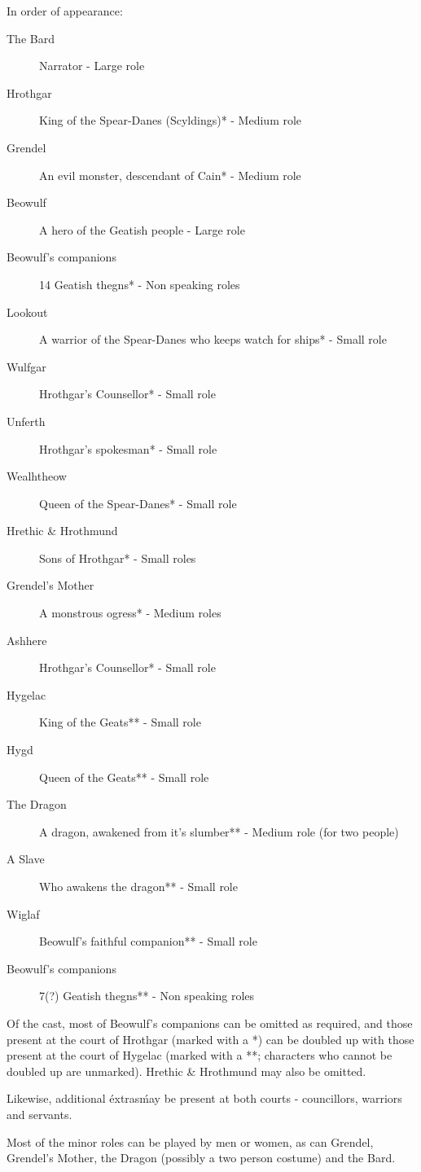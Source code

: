 \documentclass[a4paper]{article}
\begin{document}
In order of appearance:
\begin{description}
    \item[The Bard] Narrator - Large role
    \item[Hrothgar] King of the Spear-Danes (Scyldings)* - Medium role
    \item[Grendel] An evil monster, descendant of Cain* - Medium role
    \item[Beowulf] A hero of the Geatish people - Large role
    \item[Beowulf's companions] 14 Geatish thegns* - Non speaking roles
    \item[Lookout] A warrior of the Spear-Danes who keeps watch for ships* - Small role
    \item[Wulfgar] Hrothgar's Counsellor* - Small role
    \item[Unferth] Hrothgar's spokesman* - Small role
    \item[Wealhtheow] Queen of the Spear-Danes* - Small role
    \item[Hrethic \& Hrothmund] Sons of Hrothgar* - Small roles
    \item[Grendel's Mother] A monstrous ogress* - Medium roles
    \item[Ashhere] Hrothgar's Counsellor* - Small role
    \item[Hygelac] King of the Geats** - Small role
    \item[Hygd] Queen of the Geats** - Small role
    \item[The Dragon] A dragon, awakened from it's slumber** - Medium role (for two people)
    \item[A Slave] Who awakens the dragon** - Small role
    \item[Wiglaf] Beowulf's faithful companion** - Small role
    \item[Beowulf's companions] 7(?) Geatish thegns** - Non speaking roles
\end{description}

Of the cast, most of Beowulf's companions can be omitted as required, and those
present at the court of Hrothgar (marked with a  *) can be doubled up with those present at the court
of Hygelac (marked with a **; characters who cannot be doubled up are unmarked). Hrethic \& Hrothmund may also be omitted.

Likewise, additional \'extras\' may be present at both courts - councillors, warriors and servants.

Most of the minor roles can be played by men or women, as can Grendel, Grendel's
Mother, the Dragon (possibly a two person costume) and the Bard.
\end{document}
